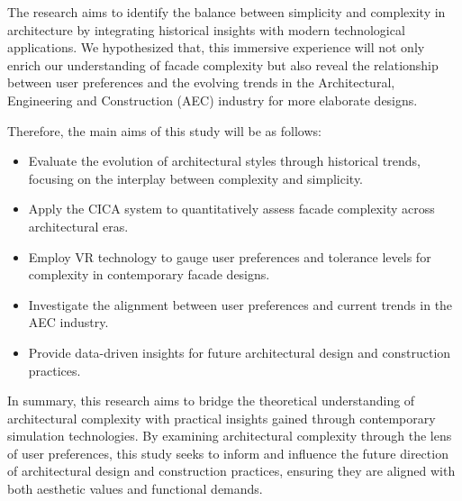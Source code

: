 The research aims to identify the balance between simplicity and complexity in architecture by integrating historical insights with modern technological applications.
We hypothesized that, this immersive experience will not only enrich our understanding of facade complexity but also reveal the relationship between user preferences and the evolving trends in the Architectural, Engineering and Construction (AEC) industry for more elaborate designs.

Therefore, the main aims of this study will be as follows:

\begin{itemize}
    \item Evaluate the evolution of architectural styles through historical trends, focusing on the interplay between complexity and simplicity.
    \item Apply the CICA system to quantitatively assess facade complexity across architectural eras.
    \item Employ VR technology to gauge user preferences and tolerance levels for complexity in contemporary facade designs.
    \item Investigate the alignment between user preferences and current trends in the AEC industry.
    \item Provide data-driven insights for future architectural design and construction practices.
\end{itemize}

In summary, this research aims to bridge the theoretical understanding of architectural complexity with practical insights gained through contemporary simulation technologies.
By examining architectural complexity through the lens of user preferences, this study seeks to inform and influence the future direction of architectural design and construction practices, ensuring they are aligned with both aesthetic values and functional demands.



